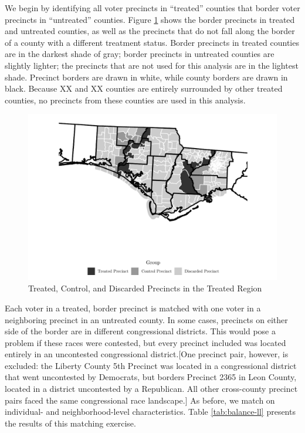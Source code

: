 \documentclass[
  12pt,
]{article}
\begin{document}
We begin by identifying all voter precincts in ``treated'' counties that border voter precincts in ``untreated'' counties. Figure \ref{fig:map} shows the border precincts in treated and untreated counties, as well as the precincts that do not fall along the border of a county with a different treatment status. Border precincts in treated counties are in the darkest shade of gray; border precincts in untreated counties are slightly lighter; the precincts that are not used for this analysis are in the lightest shade. Precinct borders are drawn in white, while county borders are drawn in black. Because XX and XX counties are entirely surrounded by other treated counties, no precincts from these counties are used in this analysis.

\begin{figure}[H]

{\centering \includegraphics{hurricane_michael_files/figure-latex/map-1} 

}

\caption{\label{fig:map}Treated, Control, and Discarded Precincts in the Treated Region}\label{fig:map}
\end{figure}

Each voter in a treated, border precinct is matched with one voter in a neighboring precinct in an untreated county. In some cases, precincts on either side of the border are in different congressional districts. This would pose a problem if these races were contested, but every precinct included was located entirely in an uncontested congressional district.{[}One precinct pair, however, is excluded: the Liberty County 5th Precinct was located in a congressional district that went uncontested by Democrats, but borders Precinct 2365 in Leon County, located in a district uncontested by a Republican. All other cross-county precinct pairs faced the same congressional race landscape.{]} As before, we match on individual- and neighborhood-level characteristics. Table \ref{tab:balance-ll} presents the results of this matching exercise.
\end{document}
